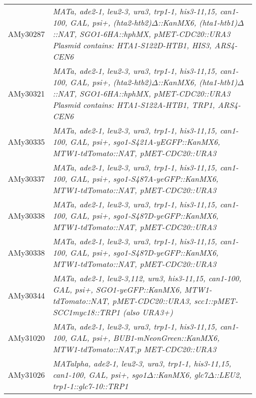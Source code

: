 \begin{longtable}{p{}p{}}
AMy30287        & \textit{MATa, ade2-1, leu2-3, ura3,   trp1-1, his3-11,15, can1-100, GAL, psi+, (hta2-htb2)$\Delta$::KanMX6,   (hta1-htb1)$\Delta$::NAT, SGO1-6HA::hphMX, pMET-CDC20::URA3 Plasmid contains:   HTA1-S122D-HTB1, HIS3, ARS4-CEN6}                                      \\
AMy30321        & \textit{MATa, ade2-1, leu2-3, ura3,   trp1-1, his3-11,15, can1-100, GAL, psi+, (hta2-htb2)$\Delta$::KanMX6,  (hta1-htb1)$\Delta$::NAT, SGO1-6HA::hphMX,   pMET-CDC20::URA3 Plasmid contains: HTA1-S122A-HTB1, TRP1, ARS4-CEN6}                                       \\
AMy30335        & \textit{MATa, ade2-1, leu2-3, ura3,   trp1-1, his3-11,15, can1-100, GAL, psi+, sgo1-S421A-yEGFP::KanMX6,   MTW1-tdTomato::NAT, pMET-CDC20::URA3}                                                                                                       \\
AMy30337        & \textit{MATa, ade2-1, leu2-3, ura3,   trp1-1, his3-11,15, can1-100, GAL, psi+, sgo1-S487A-yeGFP::KanMX6,   MTW1-tdTomato::NAT, pMET-CDC20::URA3}                                                                                                       \\
AMy30338        & \textit{MATa, ade2-1, leu2-3, ura3,   trp1-1, his3-11,15, can1-100, GAL, psi+, sgo1-S487D-yeGFP::KanMX6,   MTW1-tdTomato::NAT, pMET-CDC20::URA3}                                                                                                       \\
AMy30338        & \textit{MATa, ade2-1, leu2-3, ura3,   trp1-1, his3-11,15, can1-100, GAL, psi+, sgo1-S487D-yeGFP::KanMX6,   MTW1-tdTomato::NAT, pMET-CDC20::URA3}                                                                                                       \\
AMy30344        & \textit{MATa, ade2-1, leu2-3,112,   ura3,  his3-11,15, can1-100, GAL, psi+,   SGO1-yeGFP::KanMX6, MTW1-tdTomato::NAT, pMET-CDC20::URA3,   scc1::pMET-SCC1myc18::TRP1 (also URA3+)}                                                                     \\
AMy31020        & \textit{MATa, ade2-1, leu2-3, ura3,   trp1-1, his3-11,15, can1-100, GAL, psi+, BUB1-mNeonGreen::KanMX6,   MTW1-tdTomato::NAT,p MET-CDC20::URA3}                                                                                                        \\
AMy31026        & \textit{MATalpha, ade2-1, leu2-3, ura3,   trp1-1, his3-11,15, can1-100, GAL, psi+, sgo1$\Delta$::KanMX6, glc7$\Delta$::LEU2,   trp1-1::glc7-10::TRP1}                                                                                                                \\

\end{longtable}
